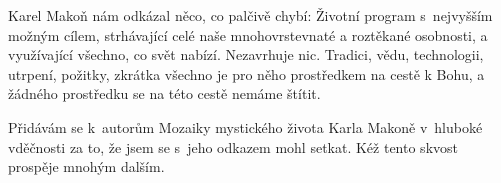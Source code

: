 Karel Makoň nám odkázal něco, co palčivě chybí: Životní program s~nejvyšším
možným cílem, strhávající celé naše mnohovrstevnaté a roztěkané osobnosti, a využívající
všechno, co svět nabízí. Nezavrhuje nic. Tradici, vědu, technologii, utrpení,
požitky, zkrátka všechno je pro něho prostředkem na cestě k Bohu, a žádného
prostředku se na této cestě nemáme štítit.

Přidávám se k~autorům Mozaiky mystického života Karla Makoně v~hluboké vděčnosti
za to, že jsem se s~jeho odkazem mohl setkat. Kéž tento skvost prospěje mnohým
dalším.
